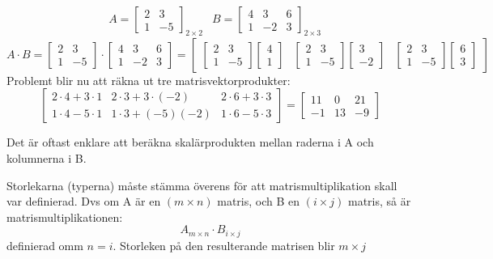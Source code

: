 \begin{Ex}
   \begin{align*}
   &A = \begin{bmatrix} 2&3\\1&-5 \end{bmatrix}_{2 \times 2} &B = \begin{bmatrix} 4&3&6\\1&-2&3 \end{bmatrix}_{2 \times 3}
   \end{align*}
   \[
       A \cdot B = \begin{bmatrix} 2&3\\1&-5 \end{bmatrix} \cdot \begin{bmatrix} 4&3&6\\1&-2&3 \end{bmatrix} = \begin{bmatrix} \begin{bmatrix} 2&3\\1&-5 \end{bmatrix}\begin{bmatrix} 4\\1 \end{bmatrix} &\begin{bmatrix} 2&3\\1&-5 \end{bmatrix}\begin{bmatrix} 3\\-2 \end{bmatrix} &\begin{bmatrix} 2&3\\1&-5 \end{bmatrix} \begin{bmatrix} 6\\3 \end{bmatrix} \end{bmatrix}
   \]
   Problemt blir nu att räkna ut tre matrisvektorprodukter:
   \[
       \begin{bmatrix} 2 \cdot 4 + 3 \cdot 1 & 2 \cdot 3 + 3 \cdot (-2) & 2 \cdot 6	+ 3 \cdot 3 \\ 1 \cdot 4 - 5 \cdot 1 & 1 \cdot 3 + (-5)(-2) & 1 \cdot 6 - 5 \cdot 3 \end{bmatrix} = \begin{bmatrix} 11&0&21\\-1&13&-9 \end{bmatrix}
   \]
\end{Ex}
Det är oftast enklare att beräkna skalärprodukten mellan raderna i A och kolumnerna i B.
\begin{Rem}
    Storlekarna (typerna) måste stämma överens för att matrismultiplikation skall var definierad. Dvs om A är en $(m \times n)$ matris, och B en $(i \times j)$ matris, så är matrismultiplikationen:
    \[
        A_{m \times n} \cdot B_{i \times j}
    \]
    definierad omm $n = i$. Storleken på den resulterande matrisen blir $m \times j$
\end{Rem}

